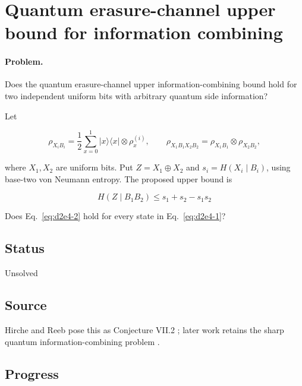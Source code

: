 \section{Quantum erasure-channel upper bound for information combining}
\label{sec:op_d2e499b973f792e7}

\paragraph{Problem.}
Does the quantum erasure-channel upper information-combining bound hold for two independent uniform bits with arbitrary quantum side information?

Let

\begin{equation}
\rho_{X_iB_i}=\frac12\sum_{x=0}^1|x\rangle\langle x|\otimes\rho_x^{(i)},
\qquad
\rho_{X_1B_1X_2B_2}=\rho_{X_1B_1}\otimes\rho_{X_2B_2},
\label{eq:d2e4-1}
\end{equation}

where $X_1,X_2$ are uniform bits. Put $Z=X_1\oplus X_2$ and $s_i=H(X_i\mid B_i)$, using base-two von Neumann entropy. The proposed upper bound is

\begin{equation}
H(Z\mid B_1B_2)\leq s_1+s_2-s_1s_2
\label{eq:d2e4-2}
\end{equation}

Does Eq.~\eqref{eq:d2e4-2} hold for every state in Eq.~\eqref{eq:d2e4-1}?

\subsection*{Status}

Unsolved

\subsection*{Source}

Hirche and Reeb pose this as Conjecture VII.2 ; later work retains the sharp quantum information-combining problem .

\subsection*{Progress}

